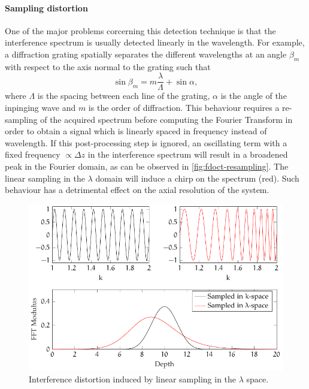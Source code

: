 \paragraph{Sampling distortion}
One of the major problems corcerning this detection technique is that the interference spectrum is usually detected linearly in the wavelength. For example, a diffraction grating spatially separates the different wavelengths at an angle $\beta_m$ with respect to the axis normal to the grating such that
\begin{equation}
	\sin\beta_m = m \frac{\lambda}{\Lambda} + \sin\alpha,
\end{equation}
where $\Lambda$ is the spacing between each line of the grating, $\alpha$ is the angle of the inpinging wave and $m$ is the order of diffraction. 
This behaviour requires a re-sampling of the acquired spectrum before computing the Fourier Transform in order to obtain a signal which is linearly spaced in frequency instead of wavelength. If this post-processing step is ignored, an oscillating term with a fixed frequency $\propto \Delta z$ in the interference spectrum will result in a broadened peak in the Fourier domain, as can be observed in \autoref{fig:fdoct-resampling}. The linear sampling in the $\lambda$ domain will induce a chirp on the spectrum (red). Such behaviour has a detrimental effect on the axial resolution of the system. 


\begin{figure}[hbt]
	\myfloatalign
	\includegraphics[width=0.95\linewidth]{gfx/tikz/fdoct-resampling}
	\caption{Interference distortion induced by linear sampling in the $\lambda$ space. }\label{fig:fdoct-resampling}
\end{figure}

